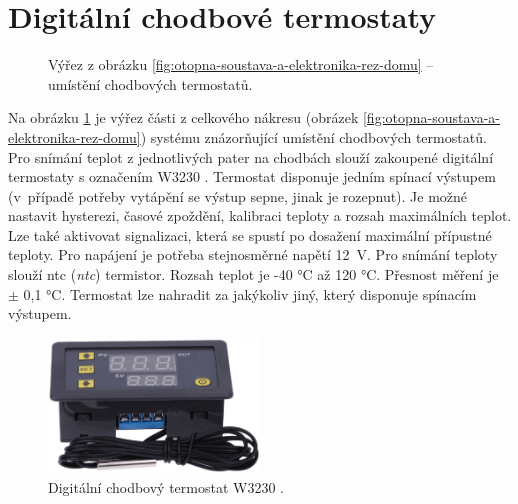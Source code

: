 \section{Digitální chodbové termostaty}
\label{sec:digitalni-chodbove-termostaty}
\begin{figure}[H]
   \centering
   \def\svgwidth{0.4\columnwidth}
   
    \caption[Umístění chodbových termostatů.]{Výřez z obrázku \ref{fig:otopna-soustava-a-elektronika-rez-domu} – umístění chodbových termostatů.}
    \label{fig:vyrez-lokalni-termostaty}
\end{figure}

Na obrázku \ref{fig:vyrez-lokalni-termostaty} je výřez části z celkového nákresu (obrázek \ref{fig:otopna-soustava-a-elektronika-rez-domu}) systému znázorňující umístění chodbových termostatů. Pro snímání teplot z jednotlivých pater na chodbách slouží zakoupené digitální termostaty s označením W3230 \cite{digitalni-termostat-w3230}. Termostat disponuje jedním spínací výstupem (v~případě potřeby vytápění se výstup sepne, jinak je rozepnut). Je možné nastavit hysterezi, časové zpoždění, kalibraci teploty a rozsah maximálních teplot. Lze také aktivovat signalizaci, která se spustí po dosažení maximální přípustné teploty. Pro napájení je potřeba stejnosměrné napětí 12~V. Pro snímání teploty slouží  \acrshort{ntc} (\textit{\acrlong{ntc}}) termistor. Rozsah teplot je -40 °C až 120 °C. Přesnost měření je $\pm$ 0,1 °C. Termostat lze nahradit za jakýkoliv jiný, který disponuje spínacím výstupem.


\begin{figure}[H]
    \centering
    \includegraphics[width=0.5\textwidth]{images/digitalni-termostat-w3230.png}
    \caption[Digitální chodbový termostat W3230.]{Digitální chodbový termostat W3230 \cite{digitalni-termostat-w3230}.}
    \label{fig:digitalni-termostat-w3230}
\end{figure}